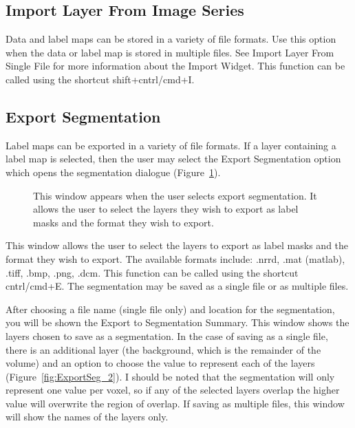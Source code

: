 \documentclass[fleqn,11pt,openany]{book}
\begin{document}
\subsection{Import Layer From Image Series}
Data and label maps can be stored in a variety of file formats.  Use this option when the data or label map is stored in multiple files. See Import Layer From Single File for more information about the Import Widget. This function can be called using the shortcut shift+cntrl/cmd+I.

\subsection{Export Segmentation}
Label maps can be exported in a variety of file formats.  If a layer containing a label map is selected, then the user may select the Export Segmentation option which opens the segmentation dialogue (Figure~\ref{fig:ExportSeg}).

\begin{figure}[h!]
\caption{This window appears when the user selects export segmentation.  It allows the user to select the layers they wish to export as label masks and the format they wish to export.}\label{fig:ExportSeg}
\end{figure}

This window allows the user to select the layers to export as label masks and the format they wish to export.  The available formats include: .nrrd, .mat (matlab), .tiff, .bmp, .png, .dcm. This function can be called using the shortcut cntrl/cmd+E.  The segmentation may be saved as a single file or as multiple files.  

After choosing a file name (single file only) and location for the segmentation, you will be shown the Export to Segmentation Summary.  This window shows the layers chosen to save as a segmentation.  In the case of saving as a single file,  there is an additional layer (the background, which is the remainder of the volume)  and an option to choose the value to represent each of the layers (Figure~\ref{fig:ExportSeg_2}).  I should be noted that the segmentation will only represent one value per voxel, so if any of the selected layers overlap the higher value will overwrite the region of overlap.  If saving as multiple files, this window will show the names of the layers only.  
\end{document}
